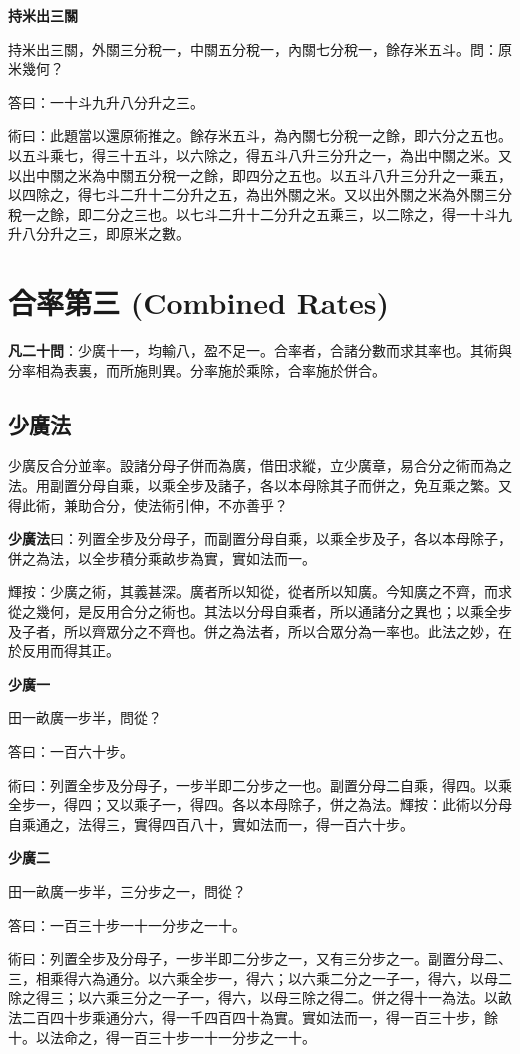 \documentclass[11pt,a4paper]{article}
\newenvironment{problemenv}[1]{%
  \medskip\noindent\textbf{#1}\par\nopagebreak\smallskip
}{\medskip}
\begin{document}
\begin{problemenv}{持米出三關}
持米出三關，外關三分稅一，中關五分稅一，內關七分稅一，餘存米五斗。問：原米幾何？

\textsf{答曰：}一十斗九升八分升之三。

\textsf{術曰：}此題當以還原術推之。餘存米五斗，為內關七分稅一之餘，即六分之五也。以五斗乘七，得三十五斗，以六除之，得五斗八升三分升之一，為出中關之米。又以出中關之米為中關五分稅一之餘，即四分之五也。以五斗八升三分升之一乘五，以四除之，得七斗二升十二分升之五，為出外關之米。又以出外關之米為外關三分稅一之餘，即二分之三也。以七斗二升十二分升之五乘三，以二除之，得一十斗九升八分升之三，即原米之數。
\end{problemenv}

\newpage
\section{合率第三 (Combined Rates)}

\textbf{凡二十問}：少廣十一，均輸八，盈不足一。合率者，合諸分數而求其率也。其術與分率相為表裏，而所施則異。分率施於乘除，合率施於併合。

\subsection{少廣法}

少廣反合分並率。設諸分母子併而為廣，借田求縱，立少廣章，易合分之術而為之法。用副置分母自乘，以乘全步及諸子，各以本母除其子而併之，免互乘之繁。又得此術，兼助合分，使法術引伸，不亦善乎？

\textbf{少廣法}曰：列置全步及分母子，而副置分母自乘，以乘全步及子，各以本母除子，併之為法，以全步積分乘畝步為實，實如法而一。

輝按：少廣之術，其義甚深。廣者所以知從，從者所以知廣。今知廣之不齊，而求從之幾何，是反用合分之術也。其法以分母自乘者，所以通諸分之異也；以乘全步及子者，所以齊眾分之不齊也。併之為法者，所以合眾分為一率也。此法之妙，在於反用而得其正。

\begin{problemenv}{少廣一}
田一畝廣一步半，問從？

\textsf{答曰：}一百六十步。

\textsf{術曰：}列置全步及分母子，一步半即二分步之一也。副置分母二自乘，得四。以乘全步一，得四；又以乘子一，得四。各以本母除子，併之為法。輝按：此術以分母自乘通之，法得三，實得四百八十，實如法而一，得一百六十步。
\end{problemenv}

\begin{problemenv}{少廣二}
田一畝廣一步半，三分步之一，問從？

\textsf{答曰：}一百三十步一十一分步之一十。

\textsf{術曰：}列置全步及分母子，一步半即二分步之一，又有三分步之一。副置分母二、三，相乘得六為通分。以六乘全步一，得六；以六乘二分之一子一，得六，以母二除之得三；以六乘三分之一子一，得六，以母三除之得二。併之得十一為法。以畝法二百四十步乘通分六，得一千四百四十為實。實如法而一，得一百三十步，餘十。以法命之，得一百三十步一十一分步之一十。
\end{problemenv}
\end{document}
